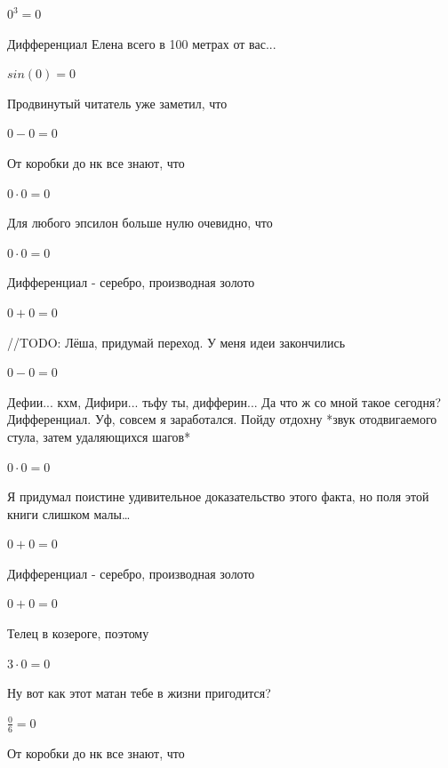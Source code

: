 \documentclass[12pt,a4paper,fleqn]{article}
\begin{document}
\begin{center}$0^{3} = 0$\end{center}
Дифференциал Елена всего в 100 метрах от вас...

\begin{center}$sin(0) = 0$\end{center}
Продвинутый читатель уже заметил, что

\begin{center}$0-0 = 0$\end{center}
От коробки до нк все знают, что

\begin{center}$0 \cdot 0 = 0$\end{center}
Для любого эпсилон больше нулю очевидно, что

\begin{center}$0 \cdot 0 = 0$\end{center}
Дифференциал - серебро, производная золото\cite{link2}

\begin{center}$0+0 = 0$\end{center}
//TODO: Лёша, придумай переход. У меня идеи закончились

\begin{center}$0-0 = 0$\end{center}
Дефии... кхм, Дифири... тьфу ты, дифферин... Да что ж со мной такое сегодня? Дифференциал. Уф, совсем я заработался. Пойду отдохну *звук отодвигаемого стула, затем удаляющихся шагов*

\begin{center}$0 \cdot 0 = 0$\end{center}
Я придумал поистине удивительное доказательство этого факта, но поля этой книги слишком малы\ldots

\begin{center}$0+0 = 0$\end{center}
Дифференциал - серебро, производная золото\cite{link2}

\begin{center}$0+0 = 0$\end{center}
Телец в козероге, поэтому

\begin{center}$3 \cdot 0 = 0$\end{center}
Ну вот как этот матан тебе в жизни пригодится?

\begin{center}$\frac{0}{6} = 0$\end{center}
От коробки до нк все знают, что
\end{document}
